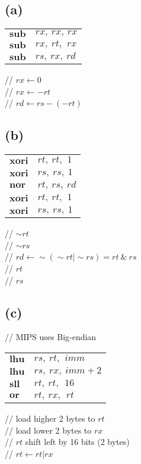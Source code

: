 \documentclass[a4paper, 11pt]{article}
\begin{document}
\subsection*{(a)}
\begin{multicols}{2}
\begin{tabular}{l l}
	$\textbf{sub}$ & $rx,\ rx,\ rx$\\
	$\textbf{sub}$ & $rx,\ rt,\ \,rx$\\
	$\textbf{sub}$ & $rs,\ rx,\ rd$\\
\end{tabular}
\columnbreak

\noindent 
// $rx \leftarrow 0$\\
// $rx \leftarrow -rt$\\
// $rd \leftarrow rs - (-rt)$\\
\end{multicols}

\subsection*{(b)}
\begin{multicols}{2}
\begin{tabular}{l l}
	$\textbf{xori}$ & $rt,\ rt,\ \,1$\\
	$\textbf{xori}$ & $rs,\ rs,\ 1$\\
	$\textbf{nor}$ & $rt,\ rs,\ rd$\\
	$\textbf{xori}$ & $rt,\ rt,\ \,1$\\
	$\textbf{xori}$ & $rs,\ rs,\ 1$\\
\end{tabular}
\columnbreak

\noindent 
// ${\sim}rt$\\
// ${\sim}rs$\\
// $rd \leftarrow {\sim}({\sim}rt|{\sim}rs) = rt\ \&\ rs$\\
// $rt$\\
// $rs$\\
\end{multicols}

\subsection*{(c)}
// MIPS uses Big-endian
\begin{multicols}{2}
\begin{tabular}{l l}
	$\textbf{lhu}$ & $rs,\ rt,\ \,imm$\\
	$\textbf{lhu}$ & $rs,\ rx,\ imm+2$\\
	$\textbf{sll}$ & $rt,\ rt,\ \;16$\\
	$\textbf{or}$ & $rt,\ rx,\ \:rt$\\
\end{tabular}
\columnbreak

\noindent
// load higher 2 bytes to $rt$\\
// load lower 2 bytes to $rx$\\
// $rt$ shift left by 16 bits (2 bytes)\\
// $rt \leftarrow rt|rx$\\
\end{multicols}
\end{document}
